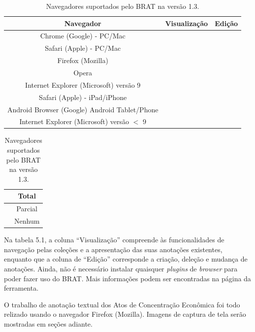 \documentclass[11pt]{report}
\newcommand{\quotes}[1]{``#1''}
\begin{document}
\begin{table}[h!]
  \centering
  \def\arraystretch{0.97}
  \begin{tabular}{| c | c | c |}
    \hline
    Navegador & Visualização & Edição \\
    \hline\hline
    Chrome (Google) - PC/Mac                      & \cellcolor{strong} & \cellcolor{strong}   \\ \hline
    Safari (Apple) - PC/Mac                       & \cellcolor{strong} & \cellcolor{strong}   \\ \hline
    Firefox (Mozilla)                             & \cellcolor{strong} & \cellcolor{moderate} \\ \hline
    Opera                                         & \cellcolor{strong} & \cellcolor{moderate} \\ \hline
    Internet Explorer (Microsoft) versão 9        & \cellcolor{strong} & \cellcolor{moderate} \\ \hline
    Safari (Apple) - iPad/iPhone                  & \cellcolor{strong} & \cellcolor{moderate} \\ \hline
    Android Browser (Google) Android Tablet/Phone & \cellcolor{strong} & \cellcolor{weak}     \\ \hline
    Internet Explorer (Microsoft) versão $<$ 9    & \cellcolor{weak}   & \cellcolor{weak}     \\ \hline
  \end{tabular}
  \begin{tabular}{| c | c |}
    \hline
    \cellcolor{strong} & Total \\ \hline
    \cellcolor{moderate} & Parcial \\ \hline
    \cellcolor{weak} & Nenhum \\ \hline
  \end{tabular}
  \caption{Navegadores suportados pelo BRAT na versão 1.3.}
\end{table}

Na tabela 5.1, a coluna \quotes{Visualização} compreende às funcionalidades de navegação pelas coleções e a apresentação das suas anotações existentes, enquanto
que a coluna de \quotes{Edição} corresponde a criação, deleção e mudança de anotações. Ainda, não é necessário instalar quaisquer \textit{plugins} de \textit{browser}
para poder fazer uso do BRAT. Mais informações podem ser encontradas na página da ferramenta.

O trabalho de anotação textual dos Atos de Concentração Econômica foi todo relizado usando o navegador Firefox (Mozilla).
Imagens de captura de tela serão mostradas em seções adiante.
\end{document}
